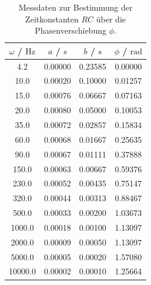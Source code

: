\begin{table}
	\caption{Messdaten zur Bestimmung der Zeitkonstanten $RC$ über die Phasenverschiebung $\phi$.}
	\label{tab:phasen}
	\centering
	\begin{tabular}{cccc}
		\toprule
		$\omega$ / $\si{\Hz}$ & $a$ / $\si{\second}$ & $b$ / $\si{\second}$ & $\phi$ / $\si{\radian}$ \\
		\midrule
		4.2                   & 0.00000              & 0.23585              & 0.00000                 \\
		10.0                  & 0.00020              & 0.10000              & 0.01257                 \\
		15.0                  & 0.00076              & 0.06667              & 0.07163                 \\
		20.0                  & 0.00080              & 0.05000              & 0.10053                 \\
		35.0                  & 0.00072              & 0.02857              & 0.15834                 \\
		60.0                  & 0.00068              & 0.01667              & 0.25635                 \\
		90.0                  & 0.00067              & 0.01111              & 0.37888                 \\
		150.0                 & 0.00063              & 0.00667              & 0.59376                 \\
		230.0                 & 0.00052              & 0.00435              & 0.75147                 \\
		320.0                 & 0.00044              & 0.00313              & 0.88467                 \\
		500.0                 & 0.00033              & 0.00200              & 1.03673                 \\
		1000.0                & 0.00018              & 0.00100              & 1.13097                 \\
		2000.0                & 0.00009              & 0.00050              & 1.13097                 \\
		5000.0                & 0.00005              & 0.00020              & 1.57080                 \\
		10000.0               & 0.00002              & 0.00010              & 1.25664                 \\
		\bottomrule
	\end{tabular}
\end{table}

